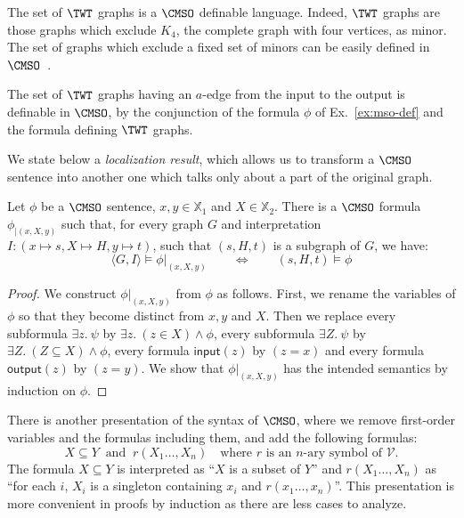\begin{example}
 The set of $\TWT$ graphs is a $\CMSO$ definable language. Indeed, $\TWT$ graphs are those graphs which exclude $K_4$, the complete graph with four vertices, as  minor. The set of graphs which exclude a fixed set of minors can be easily defined in $\CMSO$~\cite{Courcelle2012GraphSA}. 
 
 The set of $\TWT$ graphs having an $a$-edge from the input to the output is  definable in $\CMSO$, by the conjunction of the formula $\phi$ of Ex.~\ref{ex:mso-def} and the formula defining $\TWT$ graphs. 
  \end{example}

We state below a \emph{localization result}, which allows us to transform a $\CMSO$ sentence into another one which talks only about a part of the original graph. 


\begin{proposition}\label{prop:localization}
Let $\phi$ be a $\CMSO$ sentence, $x,y\in \mathbb{X}_1$ and $X\in\mathbb{X}_2$. There is a $\CMSO$ formula $\phi_{|(x,X,y)}$ such that, for every graph $G$ and  interpretation $I:(x\mapsto s, X\mapsto H, y\mapsto t)$, such that $(s,H,t)$ is a subgraph of $G$, we have:
$$ \langle G, I\rangle \models \phi|_{(x,X,y)}\qquad \Leftrightarrow \qquad (s, H, t) \models \phi$$
\end{proposition}

\begin{proof}
We construct $\phi|_{(x,X,y)}$ from $\phi$ as follows. First, we rename the variables of $\phi$ so that they become distinct from $x,y$ and $X$. Then we replace every subformula $\exists z.\ \psi$ by $\exists z.\ (z\in X)\wedge \phi$, every subformula $\exists Z.\ \psi$ by $\exists Z.\ (Z\subseteq X)\wedge \phi$,  every formula $\mathsf{input}(z)$ by $(z=x)$ and every formula $\mathsf{output}(z)$ by $(z=y)$.
We show that $\phi|_{(x,X,y)}$ has the intended semantics by induction on $\phi$. 
\end{proof}

\begin{remark} There is another  presentation of the syntax of $\CMSO$, where we remove first-order variables and the formulas including them, and  add the following formulas:
$$ X\subseteq Y\ \text{ and } \ r(X_1\dots, X_n) \quad \text{where $r$ is an $n$-ary symbol of $\mathcal{V}$.}$$
The formula $X\subseteq Y$ is interpreted as ``$X$ is a subset of $Y$'' and $r(X_1\dots, X_n)$ as ``for each $i$, $X_i$ is a singleton containing $x_i$ and $r(x_1\dots, x_n)$''.  This presentation is more convenient in proofs by induction as there are less cases to analyze. 
\end{remark}


